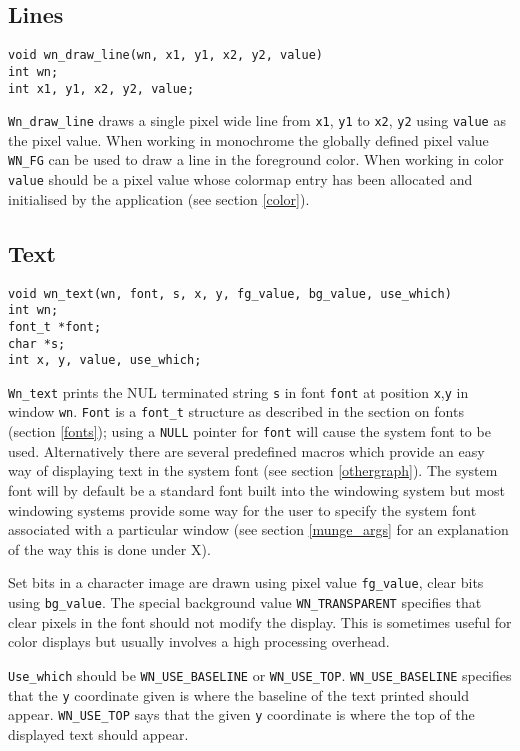 \subsection{Lines}
\begin{verbatim}
void wn_draw_line(wn, x1, y1, x2, y2, value)
int wn;
int x1, y1, x2, y2, value;
\end{verbatim}
{\tt Wn\_draw\_line} draws a single pixel wide line from
{\tt x1}, {\tt y1} to {\tt x2}, {\tt y2} 
using {\tt value} as the pixel value. When working in monochrome the globally
defined pixel value {\tt WN\_FG} can be used to draw a line in the foreground
color. When working in color {\tt value} should be a pixel value whose colormap
entry has been allocated and initialised by the application
(see section \ref{color}).
\subsection{Text}
\begin{verbatim}
void wn_text(wn, font, s, x, y, fg_value, bg_value, use_which)
int wn;
font_t *font;
char *s;
int x, y, value, use_which;
\end{verbatim}
{\tt Wn\_text} prints the NUL terminated string {\tt s} in font {\tt font}
at position {\tt x},{\tt y} in window {\tt wn}.
{\tt Font} is a {\tt font\_t} structure as described in the section on fonts
(section \ref{fonts}); using a {\tt NULL} pointer for {\tt font} will cause
the system font to be used. Alternatively there are several predefined macros
which provide an easy way of displaying text in the system font
(see section \ref{othergraph}).
The system font will by default be a standard font built into the windowing
system but most windowing systems provide some way for the user to specify the
system font associated with a particular window (see section \ref{munge_args} for
an explanation of the way this is done under X).

Set bits in a character image are drawn using pixel value {\tt fg\_value},
clear bits using {\tt bg\_value}.
The special background value {\tt WN\_TRANSPARENT} specifies that clear pixels
in the font should not modify the display.
This is sometimes useful for color displays but usually involves a high processing
overhead.

{\tt Use\_which} should be {\tt WN\_USE\_BASELINE} or {\tt WN\_USE\_TOP}\@.
{\tt WN\_USE\_BASELINE} specifies that the {\tt y} coordinate given
is where the baseline of the text printed should appear.
{\tt WN\_USE\_TOP} says that the given
{\tt y} coordinate is where the top of the displayed text should appear.
